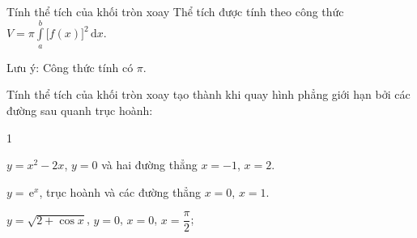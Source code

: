 \begin{dang}{Tính thể tích của khối tròn xoay}
	Thể tích được tính theo công thức $V=\pi \displaystyle\int\limits_a^b\bigg[f(x)\bigg]^2 \mathrm{\,d}x.$
	\begin{luuy}
		Lưu ý: Công thức tính có $\pi$.
	\end{luuy}
\end{dang}
\setcounter{vd}{0}

\begin{vd}
	Tính thể tích của khối tròn xoay tạo thành khi quay hình phẳng giới hạn bởi các đường sau quanh trục hoành:
	\begin{enumEX}[a)]{1}
		\item $y=x^2-2x$, $y=0$ và hai đường thẳng $x=-1$, $x=2$.
		\item $y=\mathrm{\,e}^x$, trục hoành và các đường thẳng $x=0$, $x=1$.
		\item $y=\sqrt{2+\cos x}$, $y=0$, $x=0$, $x=\dfrac{\pi}{2}$;
	\end{enumEX}
\end{vd}

